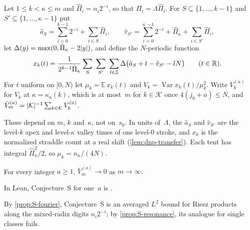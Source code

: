 \begin{definition}\label{def:dnp-profile}
Let $1\le k<\kappa\le m$ and $\hat\Pi_i=n_i2^{-i}$, so that $\Pi_i=\Lambda\hat\Pi_i$. For $S\subseteq\{1,\dots,k-1\}$ and
$S'\subseteq\{1,\dots,\kappa-1\}$ put
\[
  \hat a_S=\sum_{i=0}^{k-1}2^{-i}+\sum_{i\in S}\hat\Pi_i,\qquad
  \hat v_{S'}=\sum_{i=0}^{\kappa-1}2^{-i}+\hat\Pi_\kappa+\sum_{i\in S'}\hat\Pi_i,
\]
let $\Delta(y)=\max(0,\hat\Pi_\kappa-2\lvert y \rvert)$, and define the $N$-periodic function
\[
  x_k(t)=\frac1{2^{k-1}\hat\Pi_\kappa}\sum_{S}\ \sum_{S'}\ \sum_{l\in\Z}\Delta\bigl(\hat a_S+t-\hat v_{S'}-lN\bigr)
  \qquad(t\in\R).
\]
For $t$ uniform on $[0,N)$ let $\mu_k=\mathbb E\,x_k(t)$ and $V_k=\operatorname{Var}x_k(t)/\mu_k^2$. Write $V^{(a)}_k$ for
$V_k$ at $\kappa=\kappa_a(k)$, which is at most~$m$ for $k\in\mathcal K$ once $4(j_0+a)\le N$, and
$\bar V^{(a)}_m=\lvert \mathcal K \rvert^{-1}\sum_{k\in\mathcal K}V^{(a)}_k$.
\end{definition}

These depend on $m$, $k$ and~$\kappa$, not on~$s_0$. In units of~$\Lambda$, the $\hat a_S$ and $\hat v_{S'}$ are the
level-$k$ apex and level-$\kappa$ valley times of one level-$0$ stroke, and $x_k$ is the normalized straddle count at a real
shift (\cref{lem:dnp-transfer}). Each tent has integral $\hat\Pi_\kappa^2/2$, so $\mu_k=n_\kappa/(4N)$.

\begin{conjecture}[Conjecture S]\label{conj:S}
For every integer $a\ge1$, $\bar V^{(a)}_m\to0$ as $m\to\infty$.
\end{conjecture}

In Lean, Conjecture~S for one~$a$ is .

By \cref{prop:S-fourier}, Conjecture~S is an averaged $L^2$ bound for Riesz products along the mixed-radix digits
$n_i2^{-i}$; by \cref{prop:S-resonance}, its analogue for single classes fails.

